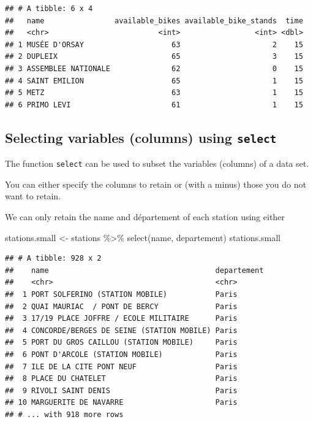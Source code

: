 \documentclass[
]{book}
\newenvironment{Shaded}{\begin{snugshade}}{\end{snugshade}}
\newcommand{\FunctionTok}[1]{\textcolor[rgb]{0.00,0.00,0.00}{#1}}
\newcommand{\NormalTok}[1]{#1}
\newcommand{\OtherTok}[1]{\textcolor[rgb]{0.56,0.35,0.01}{#1}}
\newcommand{\SpecialCharTok}[1]{\textcolor[rgb]{0.00,0.00,0.00}{#1}}
\begin{document}
\begin{verbatim}
## # A tibble: 6 x 4
##   name                available_bikes available_bike_stands  time
##   <chr>                         <int>                 <int> <dbl>
## 1 MUSÉE D'ORSAY                    63                     2    15
## 2 DUPLEIX                          65                     3    15
## 3 ASSEMBLEE NATIONALE              62                     0    15
## 4 SAINT EMILION                    65                     1    15
## 5 METZ                             63                     1    15
## 6 PRIMO LEVI                       61                     1    15
\end{verbatim}

\hypertarget{selecting-variables-columns-using-select}{%
\subsection{\texorpdfstring{Selecting variables (columns) using \texttt{select}}{Selecting variables (columns) using select}}\label{selecting-variables-columns-using-select}}

The function \texttt{select} can be used to subset the variables (columns) of a data set.

You can either specify the columns to retain or (with a minus) those you do not want to retain.

We can only retain the name and département of each station using either

\begin{Shaded}
\begin{Highlighting}[]
\NormalTok{stations.small }\OtherTok{\textless{}{-}}\NormalTok{ stations }\SpecialCharTok{\%\textgreater{}\%}
                     \FunctionTok{select}\NormalTok{(name, departement)}
\NormalTok{stations.small}
\end{Highlighting}
\end{Shaded}

\begin{verbatim}
## # A tibble: 928 x 2
##    name                                      departement
##    <chr>                                     <chr>      
##  1 PORT SOLFERINO (STATION MOBILE)           Paris      
##  2 QUAI MAURIAC  / PONT DE BERCY             Paris      
##  3 17/19 PLACE JOFFRE / ECOLE MILITAIRE      Paris      
##  4 CONCORDE/BERGES DE SEINE (STATION MOBILE) Paris      
##  5 PORT DU GROS CAILLOU (STATION MOBILE)     Paris      
##  6 PONT D'ARCOLE (STATION MOBILE)            Paris      
##  7 ILE DE LA CITE PONT NEUF                  Paris      
##  8 PLACE DU CHATELET                         Paris      
##  9 RIVOLI SAINT DENIS                        Paris      
## 10 MARGUERITE DE NAVARRE                     Paris      
## # ... with 918 more rows
\end{verbatim}
\end{document}
